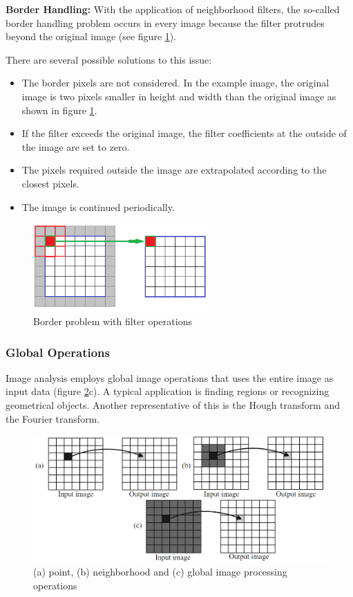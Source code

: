 \textbf{Border Handling:}
With the application of neighborhood filters, the so-called border handling
problem occurs in every image because the filter protrudes beyond the original
image (see figure \ref{fig:image_handling}).

There are several possible solutions to this issue:
\begin{itemize}
\item The border pixels are not considered. In the example image, the original image 
is two pixels smaller in height and width than the original image as shown in
figure \ref{fig:image_handling}.
\item If the filter exceeds the original image, the filter coefficients
at the outside of the image are set to zero.
\item The pixels required outside the image are extrapolated according to the closest pixels.
\item The image is continued periodically.
\end{itemize}
    
\begin{figure}[b!]
    \centering
    \includegraphics[width=0.6\textwidth]{images/theory/border_handling.png}
    \caption{Border problem with filter operations \cite{border_handling}}
    \label{fig:image_handling}
\end{figure}


\subsubsection*{Global Operations}
Image analysis employs global image operations that uses the entire image as
input data (figure \ref{fig:image_operation}c). A typical application is finding
regions or recognizing geometrical objects. Another representative of this is
the Hough transform and the Fourier transform.

\begin{figure}[tb!]
    \centering
    \includegraphics[width=\textwidth]{images/theory/image_operations.jpg}
    \caption{(a) point, (b) neighborhood and (c) global image processing
    operations \cite{image_operation}}
    \label{fig:image_operation}
\end{figure}

